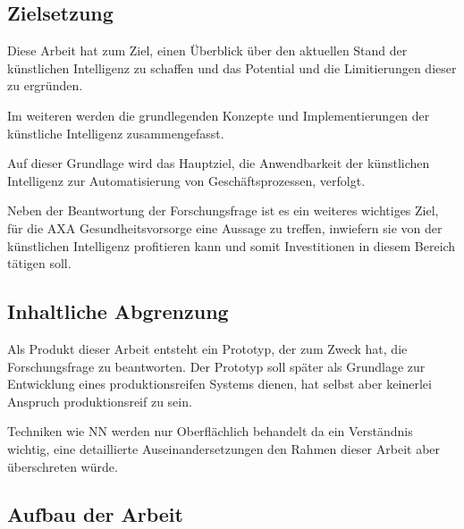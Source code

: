 


\subsection{Zielsetzung}

Diese Arbeit hat zum Ziel, einen Überblick über den aktuellen Stand der künstlichen Intelligenz zu schaffen und das Potential und die Limitierungen dieser zu ergründen.

Im weiteren werden die grundlegenden Konzepte und Implementierungen der künstliche Intelligenz zusammengefasst.

Auf dieser Grundlage wird das Hauptziel, die Anwendbarkeit der künstlichen Intelligenz zur Automatisierung von Geschäftsprozessen, verfolgt.

Neben der Beantwortung der Forschungsfrage ist es ein weiteres wichtiges Ziel, für die AXA Gesundheitsvorsorge eine Aussage zu treffen, inwiefern sie von der künstlichen Intelligenz profitieren kann und somit Investitionen in diesem Bereich tätigen soll.

\subsection{Inhaltliche Abgrenzung}


Als Produkt dieser Arbeit entsteht ein Prototyp, der zum Zweck hat, die Forschungsfrage zu beantworten. Der Prototyp soll später als Grundlage zur Entwicklung eines produktionsreifen Systems dienen, hat selbst aber keinerlei Anspruch produktionsreif zu sein.

Techniken wie NN werden nur Oberflächlich behandelt da ein Verständnis wichtig, eine detaillierte Auseinandersetzungen den Rahmen dieser Arbeit aber überschreten würde.

\subsection{Aufbau der Arbeit}

